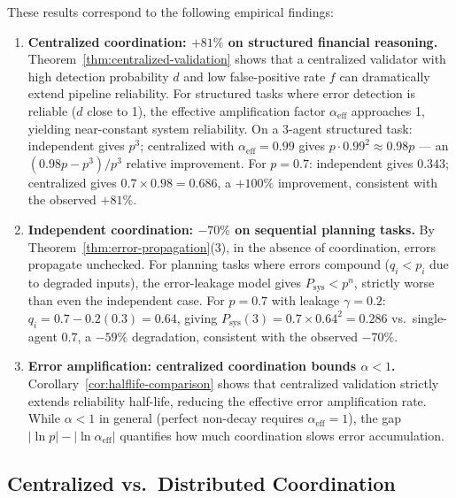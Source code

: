 \begin{remark}
\label{rmk:empirical-regime2}
These results correspond to the following empirical findings:
\begin{enumerate}
  \item \textbf{Centralized coordination: $+81\%$ on structured financial reasoning.}
  Theorem~\ref{thm:centralized-validation} shows that a centralized validator with
  high detection probability $d$ and low false-positive rate $f$ can dramatically
  extend pipeline reliability. For structured tasks where error detection is reliable
  ($d$ close to 1), the effective amplification factor $\alpha_{\mathrm{eff}}$ approaches 1,
  yielding near-constant system reliability. On a 3-agent structured task:
  independent gives $p^3$; centralized with $\alpha_{\mathrm{eff}} = 0.99$ gives
  $p \cdot 0.99^2 \approx 0.98p$ --- an $(0.98p - p^3)/p^3$ relative improvement.
  For $p = 0.7$: independent gives $0.343$; centralized gives $0.7 \times 0.98 = 0.686$,
  a $+100\%$ improvement, consistent with the observed $+81\%$.

  \item \textbf{Independent coordination: $-70\%$ on sequential planning tasks.}
  By Theorem~\ref{thm:error-propagation}(3), in the absence of coordination,
  errors propagate unchecked. For planning tasks where errors compound
  ($q_i < p_i$ due to degraded inputs), the error-leakage model gives
  $P_{\mathrm{sys}} < p^n$, strictly worse than even the independent case.
  For $p = 0.7$ with leakage $\gamma = 0.2$: $q_i = 0.7 - 0.2(0.3) = 0.64$,
  giving $P_{\mathrm{sys}}(3) = 0.7 \times 0.64^2 = 0.286$ vs.\ single-agent $0.7$,
  a $-59\%$ degradation, consistent with the observed $-70\%$.

  \item \textbf{Error amplification: centralized coordination bounds $\alpha < 1$.}
  Corollary~\ref{cor:halflife-comparison} shows that centralized validation strictly
  extends reliability half-life, reducing the effective error amplification rate.
  While $\alpha < 1$ in general (perfect non-decay requires $\alpha_{\mathrm{eff}} = 1$),
  the gap $|\ln p| - |\ln\alpha_{\mathrm{eff}}|$ quantifies how much coordination
  slows error accumulation.
\end{enumerate}
\end{remark}

\subsection{Centralized vs.\ Distributed Coordination}

